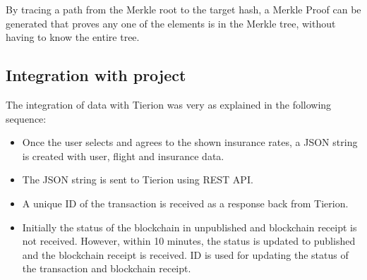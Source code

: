 By tracing a path from the Merkle root to the target hash, a Merkle Proof can be generated that proves any one of the elements is in the Merkle tree, without having to know the entire tree.

\subsection{Integration with project}
The integration of data with Tierion was very as explained in the following sequence:
\begin{itemize}
    \item Once the user selects and agrees to the shown insurance rates, a JSON string is created with user, flight and insurance data.
    \item The JSON string is sent to Tierion using REST API.
    \item A unique ID of the transaction is received as a response back from Tierion.
    \item Initially the status of the blockchain in unpublished and blockchain receipt is not received. However, within 10 minutes, the status is updated to published and the blockchain receipt is received. ID is used for updating the status of the transaction and blockchain receipt.
\end{itemize}